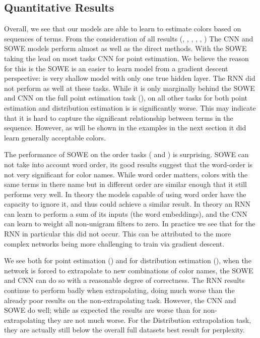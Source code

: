 \documentclass[11pt,a4paper]{article}
\begin{document}
	\clearpage


\subsection{Quantitative Results}\label{sec:quantitative-results}

Overall, we see that our models are able to learn to estimate colors based on sequences of terms.
From the consideration of all results (, , , , , )
The CNN and SOWE models perform almost as well as the direct methods.
With the SOWE taking the lead on most tasks CNN for point estimation.
We believe the reason for this is the SOWE is an easier to learn model from a gradient descent perspective: is very shallow model with only one true hidden layer.
The RNN did not perform as well at these tasks.
While it is only marginally behind the SOWE and CNN on the full point estimation task (), on all other tasks for both point estimation and distribution estimation is is significantly worse.
This may indicate that it is  hard to capture the significant relationship between terms in the sequence.
However, as will be shown in the examples in the next section it did learn generally acceptable colors.


The performance of SOWE on the order tasks ( and ) is surprising.
SOWE can not take into account word order, its good results suggest that the word-order is not very significant for color names.
While word order matters, colors with the same terms in there name but in different order are similar enough that it still performs very well.
In theory the models capable of using word order have the capacity to ignore it, and thus could achieve a similar result.
In theory an RNN can learn to perform a sum of its inputs (the word embeddings),
and the CNN can learn to weight all non-unigram filters to zero.
In practice we see that for the RNN in particular this did not occur.
This can be attributed to the more complex networks being more challenging to train via gradient descent.






We see both for point estimation () and for distribution estimation (), when the network is forced to extrapolate to new combinations of color names, the SOWE and CNN can do so with a reasonable degree of correctness.
The RNN results continue to perform badly when extrapolating, doing much worse than the already poor results on the non-extrapolating task.
However, the CNN and SOWE do well; while as expected the results are worse than for non-extrapolating they are not much worse.
For the Distribution extrapolation task, they are actually still below the overall full datasets best result for perplexity.
\end{document}
